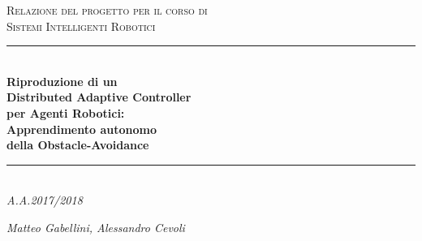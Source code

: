 \documentclass[12pt]{article}
\begin{document}

\begin{titlepage}

\newcommand{\HRule}{\rule{\linewidth}{0.5mm}}

\center

\textsc{\Large Relazione del progetto per il corso di \\ Sistemi Intelligenti Robotici}\\[0.5cm]

\HRule \\[0.4cm]
{\huge \bfseries Riproduzione di un \\[0.1cm] Distributed Adaptive Controller \\[0.1cm] per Agenti Robotici: \\[0.1cm] Apprendimento autonomo \\[0.5cm] della Obstacle-Avoidance}\\[0.4cm]
\HRule \\[1.cm]

\emph{A.A.2017/2018}

\vfill

\emph{Matteo Gabellini, Alessandro Cevoli}\\[3cm]

\end{titlepage}


\tableofcontents













\end{document}
